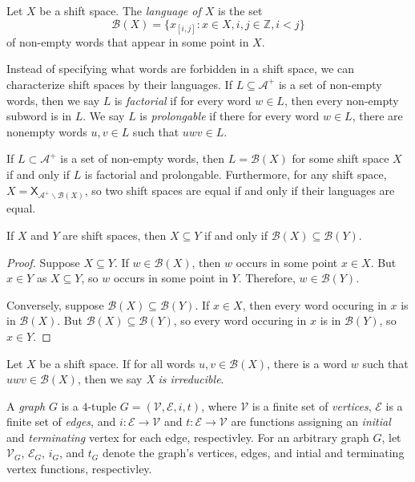 \documentclass[hidelinks]{article}
\newcommand{\Ac}{\mathcal{A}}  %
\newcommand{\Vc}{\mathcal{V}}
\newcommand{\Ec}{\mathcal{E}}
\newcommand{\Bc}{\mathcal{B}}
\newcommand{\shift}[1]{\mathsf{X}_{#1}}
\newcommand{\term}[1]{\textit{#1}}
\theoremstyle{definition}
\begin{document}
\begin{definition}
    Let \(X\) be a shift space. The \term{language of \(X\)} is the set 
    \[\Bc(X) = \{ x_{[i,j]} : x \in X, i, j \in \mathbb{Z}, i < j\}\]
    of non-empty words that appear in some point in \(X\).
\end{definition}

Instead of specifying what words are forbidden in a shift space, we can characterize 
shift spaces by their languages. If \(L \subseteq \Ac^+\) is a set of non-empty words, then 
we say \(L\) is \term{factorial} if for every word \(w \in L\), then every non-empty subword 
is in \(L\). We say \(L\) is \term{prolongable} if there for every word \(w \in L\), 
there are nonempty words \(u, v \in L\) such that \(uwv \in L\).

\begin{theorem}[name=\cite{lind1995introduction}]
    If \(L \subset \Ac^+\) is a set of non-empty words, then \(L = \Bc(X)\) for some 
    shift space \(X\) if and only if \(L\) is factorial and prolongable. 
    Furthermore, for any shift space, \(X = \shift{\Ac^+\backslash\Bc(X)}\), so 
    two shift spaces are equal if and only if their languages are equal.
\end{theorem}

\begin{theorem}
    If \(X\) and \(Y\) are shift spaces, then \(X \subseteq Y\) if and only if \(\Bc(X) \subseteq \Bc(Y)\).
\end{theorem}

\begin{proof}
    Suppose \(X \subseteq Y\). If \(w \in \Bc(X)\), then \(w\) occurs in some point 
    \(x \in X\). But \(x \in Y\) as \(X \subseteq Y\), so \(w\) occurs in some point 
    in \(Y\). Therefore, \(w \in \Bc(Y)\).

    Conversely, suppose \(\Bc(X) \subseteq \Bc(Y)\). If \(x \in X\), then every 
    word occuring in \(x\) is in \(\Bc(X)\). But \(\Bc(X) \subseteq \Bc(Y)\), 
    so every word occuring in \(x\) is in \(\Bc(Y)\), so \(x \in Y\).
\end{proof}

\begin{definition}
    Let \(X\) be a shift space. If for all words \(u, v \in \Bc(X)\), there 
    is a word \(w\) such that \(uwv \in \Bc(X)\), then we say \term{X is irreducible}.
\end{definition}

\begin{definition}
    A \term{graph} \(G\) is a \(4\)-tuple \(G = (\Vc, \Ec, i, t)\), where \(\Vc\) is a finite 
    set of \term{vertices}, \(\Ec\) is a finite set of \term{edges}, and \(i : \Ec \to \Vc\) and 
    \(t : \Ec \to \Vc\) are functions assigning an \term{initial} and \term{terminating} vertex for 
    each edge, respectivley. For an arbitrary graph \(G\), let 
    \(\Vc_G\), \(\Ec_G\), \(i_G\), and \(t_G\) denote the graph's vertices, edges, and 
    intial and terminating vertex functions, respectivley. 
\end{definition}
\end{document}
